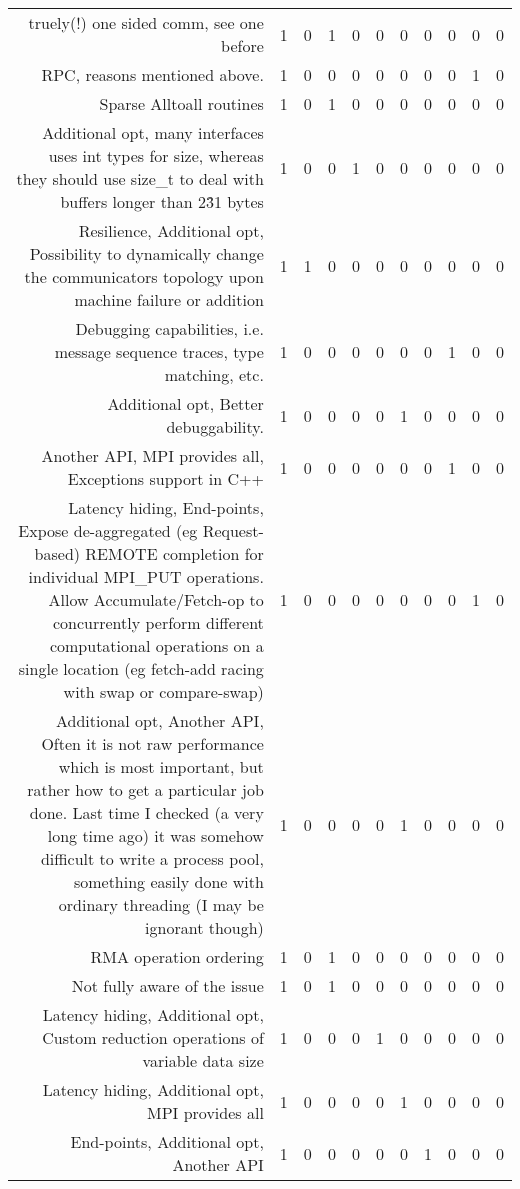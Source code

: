 {\begin{landscape}
\begin{longtable}[htb]{r|c|c|c|c|c|c|c|c|c|c}
{truely(!) one sided comm, see one before} & 1 & 0 & 1 & 0 & 0 & 0 & 0 & 0 & 0 & 0 \\%
{RPC, reasons mentioned above.} & 1 & 0 & 0 & 0 & 0 & 0 & 0 & 0 & 1 & 0 \\%
{Sparse Alltoall routines} & 1 & 0 & 1 & 0 & 0 & 0 & 0 & 0 & 0 & 0 \\%
{Additional opt, many interfaces uses int types for size, whereas they should use size\_t to deal with buffers longer than 2\^31 bytes} & 1 & 0 & 0 & 1 & 0 & 0 & 0 & 0 & 0 & 0 \\%
{Resilience, Additional opt, Possibility to dynamically change the communicators topology upon machine failure or addition} & 1 & 1 & 0 & 0 & 0 & 0 & 0 & 0 & 0 & 0 \\%
{Debugging capabilities, i.e. message sequence traces, type matching, etc.} & 1 & 0 & 0 & 0 & 0 & 0 & 0 & 1 & 0 & 0 \\%
{Additional opt, Better debuggability.} & 1 & 0 & 0 & 0 & 0 & 1 & 0 & 0 & 0 & 0 \\%
{Another API, MPI provides all, Exceptions support in C++} & 1 & 0 & 0 & 0 & 0 & 0 & 0 & 1 & 0 & 0 \\%
{Latency hiding, End-points, Expose de-aggregated (eg Request-based) REMOTE completion for individual MPI\_PUT operations. Allow Accumulate/Fetch-op to concurrently perform different computational operations on a single location (eg fetch-add racing with swap or compare-swap)} & 1 & 0 & 0 & 0 & 0 & 0 & 0 & 0 & 1 & 0 \\%
{Additional opt, Another API, Often it is not raw performance which is most important, but rather how to get a particular job done.  Last time I checked (a very long time ago) it was somehow difficult to write a process pool, something easily done with ordinary threading (I may be ignorant though)} & 1 & 0 & 0 & 0 & 0 & 1 & 0 & 0 & 0 & 0 \\%
{RMA operation ordering} & 1 & 0 & 1 & 0 & 0 & 0 & 0 & 0 & 0 & 0 \\%
{Not fully aware of the issue} & 1 & 0 & 1 & 0 & 0 & 0 & 0 & 0 & 0 & 0 \\%
{Latency hiding, Additional opt, Custom reduction operations of variable data size} & 1 & 0 & 0 & 0 & 1 & 0 & 0 & 0 & 0 & 0 \\%
{Latency hiding, Additional opt, MPI provides all} & 1 & 0 & 0 & 0 & 0 & 1 & 0 & 0 & 0 & 0 \\%
{End-points, Additional opt, Another API} & 1 & 0 & 0 & 0 & 0 & 0 & 1 & 0 & 0 & 0 \\%

\end{longtable}
\end{landscape}}
